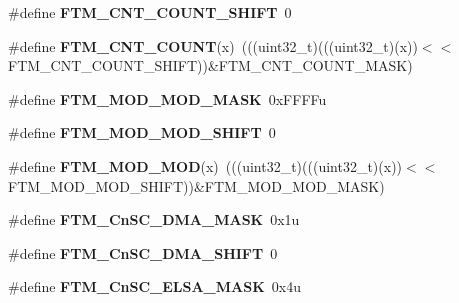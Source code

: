 \begin{DoxyCompactItemize}
\item 
\#define {\bfseries F\+T\+M\+\_\+\+C\+N\+T\+\_\+\+C\+O\+U\+N\+T\+\_\+\+S\+H\+I\+FT}~0\hypertarget{group__FTM__Register__Masks_gacab5bfefd759b4b0d8e4949a872f96e2}{}\label{group__FTM__Register__Masks_gacab5bfefd759b4b0d8e4949a872f96e2}

\item 
\#define {\bfseries F\+T\+M\+\_\+\+C\+N\+T\+\_\+\+C\+O\+U\+NT}(x)~(((uint32\+\_\+t)(((uint32\+\_\+t)(x))$<$$<$F\+T\+M\+\_\+\+C\+N\+T\+\_\+\+C\+O\+U\+N\+T\+\_\+\+S\+H\+I\+FT))\&F\+T\+M\+\_\+\+C\+N\+T\+\_\+\+C\+O\+U\+N\+T\+\_\+\+M\+A\+SK)\hypertarget{group__FTM__Register__Masks_ga96ac13f31821791e3456cf6672b6a3b6}{}\label{group__FTM__Register__Masks_ga96ac13f31821791e3456cf6672b6a3b6}

\item 
\#define {\bfseries F\+T\+M\+\_\+\+M\+O\+D\+\_\+\+M\+O\+D\+\_\+\+M\+A\+SK}~0x\+F\+F\+F\+Fu\hypertarget{group__FTM__Register__Masks_gae815072c26d186e4ad07654080c7cb97}{}\label{group__FTM__Register__Masks_gae815072c26d186e4ad07654080c7cb97}

\item 
\#define {\bfseries F\+T\+M\+\_\+\+M\+O\+D\+\_\+\+M\+O\+D\+\_\+\+S\+H\+I\+FT}~0\hypertarget{group__FTM__Register__Masks_gac10320219038f5acd0cc6ed04c4f1f48}{}\label{group__FTM__Register__Masks_gac10320219038f5acd0cc6ed04c4f1f48}

\item 
\#define {\bfseries F\+T\+M\+\_\+\+M\+O\+D\+\_\+\+M\+OD}(x)~(((uint32\+\_\+t)(((uint32\+\_\+t)(x))$<$$<$F\+T\+M\+\_\+\+M\+O\+D\+\_\+\+M\+O\+D\+\_\+\+S\+H\+I\+FT))\&F\+T\+M\+\_\+\+M\+O\+D\+\_\+\+M\+O\+D\+\_\+\+M\+A\+SK)\hypertarget{group__FTM__Register__Masks_ga80e3c2799c6f4480a6b8c983783ee052}{}\label{group__FTM__Register__Masks_ga80e3c2799c6f4480a6b8c983783ee052}

\item 
\#define {\bfseries F\+T\+M\+\_\+\+Cn\+S\+C\+\_\+\+D\+M\+A\+\_\+\+M\+A\+SK}~0x1u\hypertarget{group__FTM__Register__Masks_gab38e53cd8f53bb325b849510374280f8}{}\label{group__FTM__Register__Masks_gab38e53cd8f53bb325b849510374280f8}

\item 
\#define {\bfseries F\+T\+M\+\_\+\+Cn\+S\+C\+\_\+\+D\+M\+A\+\_\+\+S\+H\+I\+FT}~0\hypertarget{group__FTM__Register__Masks_ga86e1227e22b8a08811a810d4f8415ef1}{}\label{group__FTM__Register__Masks_ga86e1227e22b8a08811a810d4f8415ef1}

\item 
\#define {\bfseries F\+T\+M\+\_\+\+Cn\+S\+C\+\_\+\+E\+L\+S\+A\+\_\+\+M\+A\+SK}~0x4u\hypertarget{group__FTM__Register__Masks_gab5c67eddb15cb1814ba34d7d65bcee29}{}\label{group__FTM__Register__Masks_gab5c67eddb15cb1814ba34d7d65bcee29}


\end{DoxyCompactItemize}
